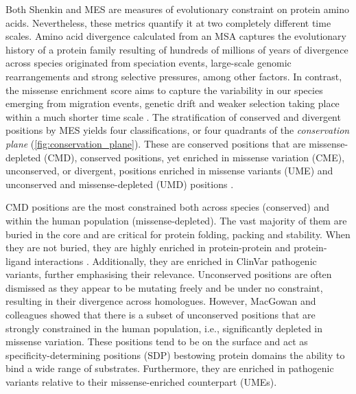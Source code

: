 Both Shenkin and MES are measures of evolutionary constraint on protein amino acids. Nevertheless, these metrics quantify it at two completely different time scales. Amino acid divergence calculated from an MSA captures the evolutionary history of a protein family resulting of hundreds of millions of years of divergence across species originated from speciation events, large-scale genomic rearrangements and strong selective pressures, among other factors. In contrast, the missense enrichment score aims to capture the variability in our species emerging from migration events, genetic drift and weaker selection taking place within a much shorter time scale \cite{HUBLIN_2017_HUMAN}. The stratification of conserved and divergent positions by MES yields four classifications, or four quadrants of the \textit{conservation plane} (\autoref{fig:conservation_plane}). These are conserved positions that are missense-depleted (CMD), conserved positions, yet enriched in missense variation (CME), unconserved, or divergent, positions enriched in missense variants (UME) and unconserved and missense-depleted (UMD) positions \cite{MACGOWAN_2024_VARIANTS}.

CMD positions are the most constrained both across species (conserved) and within the human population (missense-depleted). The vast majority of them are buried in the core and are critical for protein folding, packing and stability. When they are not buried, they are highly enriched in protein-protein and protein-ligand interactions \cite{UTGES_2021_ANKS}. Additionally, they are enriched in ClinVar \cite{LANDRUM_2013_CLINVAR} pathogenic variants, further emphasising their relevance. Unconserved positions are often dismissed as they appear to be mutating freely and be under no constraint, resulting in their divergence across homologues. However, MacGowan and colleagues \cite{MACGOWAN_2024_VARIANTS} showed that there is a subset of unconserved positions that are strongly constrained in the human population, i.e., significantly depleted in missense variation. These positions tend to be on the surface and act as specificity-determining positions (SDP) bestowing protein domains the ability to bind a wide range of substrates. Furthermore, they are enriched in pathogenic variants relative to their missense-enriched counterpart (UMEs).


